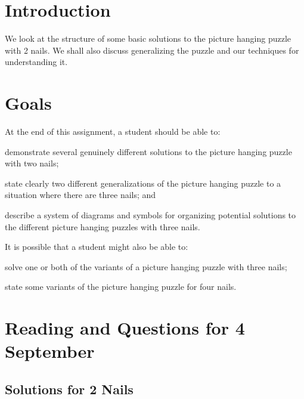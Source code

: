 \documentclass[12pt,letterpaper]{article}
\theoremstyle{definition}
\begin{document}
\setlength{\parskip}{1ex plus 0.5ex minus 0.2ex}
\setlength{\parindent}{0pt}

\pagestyle{fancy}
\cfoot{}

\section*{Introduction}
We look at the structure of some basic solutions to the picture hanging puzzle with 2 nails.
We shall also discuss generalizing the puzzle and our techniques for understanding it.

\section*{Goals}
At the end of this assignment, a student should be able to:
\begin{compactitem}
\item demonstrate several genuinely different solutions to the picture hanging puzzle with two nails;
\item state clearly two different generalizations of the picture hanging puzzle to a situation where there are three nails; and
\item describe a system of diagrams and symbols for organizing potential solutions to the different picture hanging puzzles with three nails.
\end{compactitem}
It is possible that a student might also be able to:
\begin{compactitem}
\item solve one or both of the variants of a picture hanging puzzle with three nails;
\item state some variants of the picture hanging puzzle for four nails.
\end{compactitem}

\section*{Reading and Questions for 4 September}

\subsection*{Solutions for 2 Nails}
\end{document}
